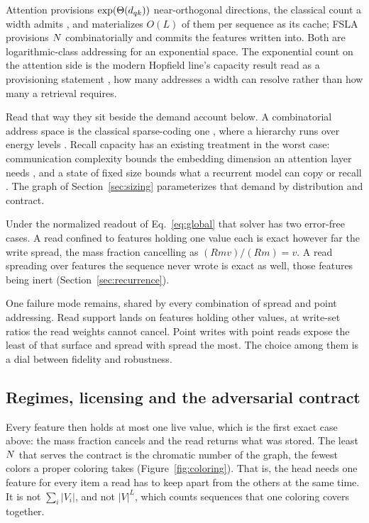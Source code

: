 Attention provisions $\exp(\Theta(d_{qk}))$ near-orthogonal directions, the classical count a width admits \citep{johnson1984}, and materializes $O(L)$ of them per sequence as its cache; FSLA provisions $N$ combinatorially and commits the features written into. Both are logarithmic-class addressing for an exponential space. The exponential count on the attention side is the modern Hopfield line's capacity result read as a provisioning statement \citep{krotov2016dam, demircigil2017capacity, ramsauer2021hopfield, hu2024optimal}, how many addresses a width can resolve rather than how many a retrieval requires.

Read that way they sit beside the demand account below. A combinatorial address space is the classical sparse-coding one \citep{willshaw1969, kanerva1988sdm}, where a hierarchy runs over energy levels \citep{krotov2021hierarchical}. Recall capacity has an existing treatment in the worst case: communication complexity bounds the embedding dimension an attention layer needs \citep{sanford2023representational}, and a state of fixed size bounds what a recurrent model can copy or recall \citep{jelassi2024copying, arora2023zoology}. The graph of Section~\ref{sec:sizing} parameterizes that demand by distribution and contract.

Under the normalized readout of Eq.~\eqref{eq:global} that solver has two error-free cases. A read confined to features holding one value each is exact however far the write spread, the mass fraction cancelling as $(R m v)/(R m) = v$. A read spreading over features the sequence never wrote is exact as well, those features being inert (Section~\ref{sec:recurrence}).

One failure mode remains, shared by every combination of spread and point addressing. Read support lands on features holding other values, at write-set ratios the read weights cannot cancel. Point writes with point reads expose the least of that surface and spread with spread the most. The choice among them is a dial between fidelity and robustness.

\subsection{Regimes, licensing and the adversarial contract}
\label{apd:regimes}

Every feature then holds at most one live value, which is the first exact case above: the mass fraction cancels and the read returns what was stored. The least $N$ that serves the contract is the chromatic number of the graph, the fewest colors a proper coloring takes (Figure~\ref{fig:coloring}). That is, the head needs one feature for every item a read has to keep apart from the others at the same time. It is not $\sum_i |V_i|$, and not $|V|^L$, which counts sequences that one coloring covers together.

